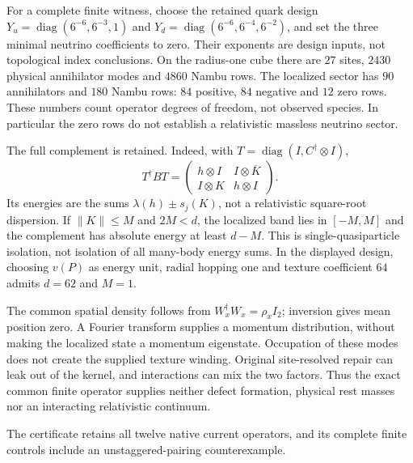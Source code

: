 For a complete finite witness, choose the retained quark design
$Y_u=\operatorname{diag}(6^{-6},6^{-3},1)$ and
$Y_d=\operatorname{diag}(6^{-6},6^{-4},6^{-2})$, and set the three
minimal neutrino coefficients to zero. Their exponents are design inputs,
not topological index conclusions. On the radius-one cube there are
$27$ sites, $2430$ physical annihilator modes and $4860$ Nambu rows.
The localized sector has $90$ annihilators and $180$ Nambu rows:
$84$ positive, $84$ negative and $12$ zero rows. These numbers count
operator degrees of freedom, not observed species. In particular the
zero rows do not establish a relativistic massless neutrino sector.

The full complement is retained. Indeed, with
$T=\operatorname{diag}(I,C^\dagger\otimes I)$,
\[
 T^\dagger BT=
 \begin{pmatrix}h\otimes I&I\otimes\overline K\\
                 I\otimes K&h\otimes I\end{pmatrix}.
\]
Its energies are the sums $\lambda(h)\pm s_j(K)$, not a relativistic
square-root dispersion. If $\|K\|\le M$ and $2M<d$, the localized band
lies in $[-M,M]$ and the complement has absolute energy at least $d-M$.
This is single-quasiparticle isolation, not isolation of all many-body
energy sums. In the displayed design, choosing $v(P)$ as energy unit,
radial hopping one and texture coefficient $64$ admits $d=62$ and $M=1$.

The common spatial density follows from
$W_x^\dagger W_x=\rho_x I_2$; inversion gives mean position zero.
A Fourier transform supplies a momentum distribution, without making the
localized state a momentum eigenstate. Occupation of these modes does not
create the supplied texture winding. Original site-resolved repair can
leak out of the kernel, and interactions can mix the two factors.
Thus the exact common finite operator supplies neither defect formation,
physical rest masses nor an interacting relativistic continuum.

The certificate retains all twelve native current operators, and its complete
finite controls include an unstaggered-pairing counterexample.
